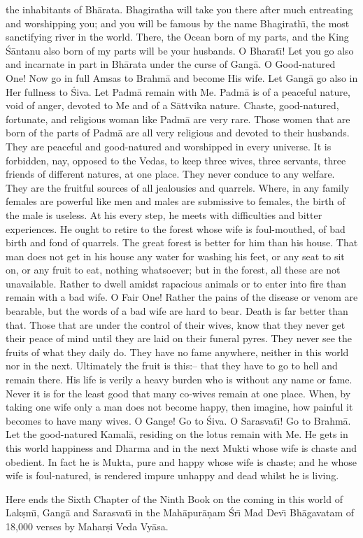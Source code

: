 the inhabitants of Bh\=arata. Bhagiratha will take you there after much entreating and worshipping you; and you will be famous by the name Bhagirath\={\i}, the most sanctifying river in the world. There, the Ocean born of my parts, and the King \'S\=antanu also born of my parts will be your husbands. O Bharat\={\i}! Let you go also and incarnate in part in Bh\=arata under the curse of Gang\=a. O Good-natured One! Now go in full Amsas to Brahm\=a and become His wife. Let Gang\=a go also in Her fullness to \'Siva. Let Padm\=a remain with Me. Padm\=a is of a peaceful nature, void of anger, devoted to Me and of a S\=attvika nature. Chaste, good-natured, fortunate, and religious woman like Padm\=a are very rare. Those women that are born of the parts of Padm\=a are all very religious and devoted to their husbands. They are peaceful and good-natured and worshipped in every universe. It is forbidden, nay, opposed to the Vedas, to keep three wives, three servants, three friends of different natures, at one place. They never conduce to any welfare. They are the fruitful sources of all jealousies and quarrels. Where, in any family females are powerful like men and males are submissive to females, the birth of the male is useless. At his every step, he meets with difficulties and bitter experiences. He ought to retire to the forest whose wife is foul-mouthed, of bad birth and fond of quarrels. The great forest is better for him than his house. That man does not get in his house any water for washing his feet, or any seat to sit on, or any fruit to eat, nothing whatsoever; but in the forest, all these are not unavailable. Rather to dwell amidst rapacious animals or to enter into fire than remain with a bad wife. O Fair One! Rather the pains of the disease or venom are bearable, but the words of a bad wife are hard to bear. Death is far better than that. Those that are under the control of their wives, know that they never get their peace of mind until they are laid on their funeral pyres. They never see the fruits of what they daily do. They have no fame anywhere, neither in this world nor in the next. Ultimately the fruit is this:-- that they have to go to hell and remain there. His life is verily a heavy burden who is without any name or fame. Never it is for the least good that many co-wives remain at one place. When, by taking one wife only a man does not become happy, then imagine, how painful it becomes to have many wives. O Gange! Go to \'Siva. O Sarasvat\={\i}! Go to Brahm\=a. Let the good-natured Kamal\=a, residing on the lotus remain with Me. He gets in this world happiness and Dharma and in the next Mukti whose wife is chaste and obedient. In fact he is Mukta, pure and happy whose wife is chaste; and he whose wife is foul-natured, is rendered impure unhappy and dead whilst he is living.

Here ends the Sixth Chapter of the Ninth Book on the coming in this world of Lak\d{s}m\={\i}, Gang\=a and Sarasvat\={\i} in the Mah\=apur\=a\d{n}am \'Sr\={\i} Mad Dev\={\i} Bh\=agavatam of 18,000 verses by Mahar\d{s}i Veda Vy\=asa.



